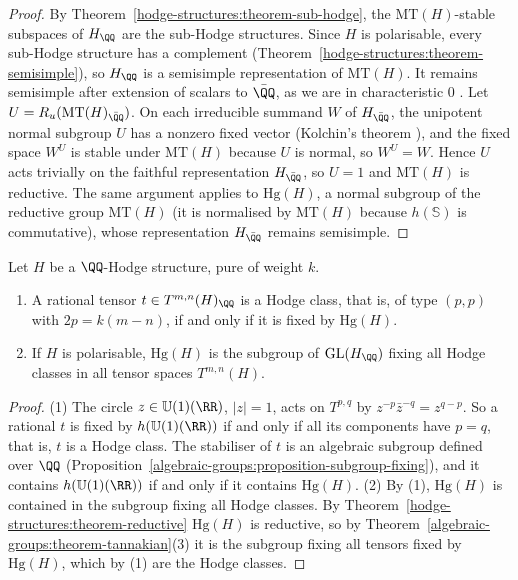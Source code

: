 \begin{proof}
By Theorem~\ref{hodge-structures:theorem-sub-hodge}, the $\mathrm{MT}(H)$-stable subspaces of $H_\QQ$ are the sub-Hodge structures. Since $H$ is polarisable, every sub-Hodge structure has a complement
(Theorem~\ref{hodge-structures:theorem-semisimple}), so $H_\QQ$ is a semisimple representation of $\mathrm{MT}(H)$. It remains semisimple after extension of scalars to $\bar{\QQ}$, as we are in
characteristic $0$ \cite{milne-algebraic-groups}. Let $U = R_u(\mathrm{MT}(H)_{\bar{\QQ}})$. On each irreducible summand $W$ of $H_{\bar{\QQ}}$, the unipotent normal subgroup $U$ has a nonzero fixed
vector (Kolchin's theorem \cite{borel-lag}), and the fixed space $W^U$ is stable under $\mathrm{MT}(H)$ because $U$ is normal, so $W^U = W$. Hence $U$ acts trivially on the faithful
representation $H_{\bar{\QQ}}$, so $U = 1$ and $\mathrm{MT}(H)$ is reductive. The same argument applies to $\mathrm{Hg}(H)$, a normal subgroup of the reductive group $\mathrm{MT}(H)$ (it is normalised by
$\mathrm{MT}(H)$ because $h(\mathbb{S})$ is commutative), whose representation $H_{\bar{\QQ}}$ remains semisimple.
\end{proof}

\begin{theorem}\label{hodge-structures:theorem-hodge-classes-invariants}
Let $H$ be a $\QQ$-Hodge structure, pure of weight $k$.
\begin{enumerate}
\item A rational tensor $t \in T^{m,n}(H)_\QQ$ is a Hodge class, that is, of type $(p, p)$ with $2p = k(m - n)$, if and only if it is fixed by $\mathrm{Hg}(H)$.
\item If $H$ is polarisable, $\mathrm{Hg}(H)$ is the subgroup of $\mathrm{GL}(H_\QQ)$ fixing all Hodge classes in all tensor spaces $T^{m,n}(H)$.
\end{enumerate}
\end{theorem}

\begin{proof}
(1) The circle $z \in \mathbb{U}(1)(\RR)$, $|z| = 1$, acts on $T^{p,q}$ by $z^{-p}\bar z^{-q} = z^{q-p}$. So a rational $t$ is fixed by $h(\mathbb{U}(1)(\RR))$ if and only if all its components have
$p = q$, that is, $t$ is a Hodge class. The stabiliser of $t$ is an algebraic subgroup defined over $\QQ$ (Proposition~\ref{algebraic-groups:proposition-subgroup-fixing}), and it contains
$h(\mathbb{U}(1)(\RR))$ if and only if it contains $\mathrm{Hg}(H)$. (2) By (1), $\mathrm{Hg}(H)$ is contained in the subgroup fixing all Hodge classes. By Theorem~\ref{hodge-structures:theorem-reductive}
$\mathrm{Hg}(H)$ is reductive, so by Theorem~\ref{algebraic-groups:theorem-tannakian}(3) it is the subgroup fixing all tensors fixed by $\mathrm{Hg}(H)$, which by (1) are the Hodge classes.
\end{proof}

